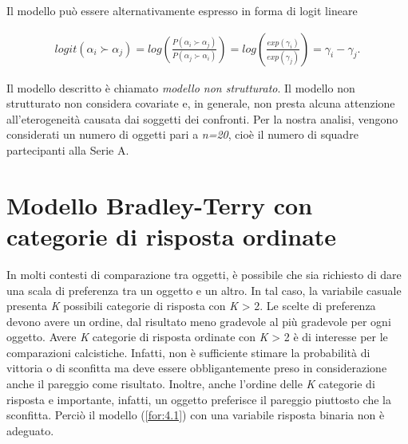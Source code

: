 Il modello può essere alternativamente espresso in forma di logit lineare

\begin{align}
	logit(\alpha_{i} \succ \alpha_{j}) =  log\left( \frac{P( \alpha_{i} \succ \alpha_{j})}{P( \alpha_{j} \succ \alpha_{i})} \right) = log\left(\frac{exp(\gamma_{i})}{exp(\gamma_{j})}\right) = \gamma_i - \gamma_j \label{for:4.1}.
\end{align}

Il modello descritto è chiamato \emph{modello non strutturato}. Il modello non strutturato non considera covariate e, in generale, non presta alcuna attenzione all'eterogeneità causata dai soggetti dei confronti.
Per la nostra analisi, vengono considerati un numero di oggetti pari a \emph{n=20}, cioè il numero di squadre partecipanti alla Serie A.


\section{Modello Bradley-Terry con categorie di risposta ordinate}\label{sez:4.2}
In molti contesti di comparazione tra oggetti, è possibile che sia richiesto di dare una scala di preferenza tra un oggetto e un altro. In tal caso, la variabile casuale presenta \emph{K} possibili categorie di risposta con \emph{K} > 2. Le scelte di preferenza devono avere un ordine, dal risultato meno gradevole al più gradevole per ogni oggetto. Avere \emph{K} categorie di risposta ordinate con \emph{K} > 2 è di interesse per le comparazioni calcistiche. Infatti, non è sufficiente stimare la probabilità di vittoria o di sconfitta ma deve essere obbligantemente preso in considerazione anche il pareggio come risultato. Inoltre, anche l'ordine delle \emph{K} categorie di risposta e importante, infatti, un oggetto preferisce il pareggio piuttosto che la sconfitta. Perciò il modello (\ref{for:4.1}) con una variabile risposta binaria non è adeguato. 



